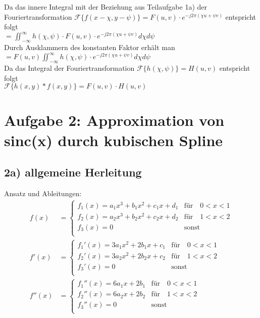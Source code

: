 \documentclass[a4paper,11pt,oneside]{scrartcl}
\begin{document}
Da das innere Integral mit der Beziehung aus Teilaufgabe 1a) der Fouriertransformation $\mathcal{F}\{f(x-\chi,y-\psi)\}=F(u,v)\cdot e^{-j2\pi(\chi u+\psi v)}$ entspricht folgt \\

$=\iint_{-\infty}^{\infty}h(\chi,\psi)\cdot F(u,v)\cdot e^{-j2\pi(\chi u+\psi v)} d\chi d\psi$ \\

Durch Ausklammern des konstanten Faktor erhält man \\

$=F(u,v)\iint_{-\infty}^{\infty}h(\chi,\psi)\cdot e^{-j2\pi(\chi u+\psi v)} d\chi d\psi$ \\

Da das Integral der Fouriertransformation $\mathcal{F}\{h(\chi,\psi)\}=H(u,v)$ entspricht folgt \\

$\mathcal{F}\{h(x,y)\ast f(x,y)\}=F(u,v)\cdot H(u,v)$

\newpage

\section*{Aufgabe 2: Approximation von sinc(x) durch kubischen Spline}
\subsection*{2a) allgemeine Herleitung}
Ansatz und Ableitungen:\\
\begin{equation*}
\begin{array}{ll}
f(x) & = 
 \left\{ 
  \begin{array}{ll}
   f_1(x) = a_1x^3 + b_1x^2 + c_1x + d_1 & \text{für} \quad 0 < x < 1\\
   f_2(x) = a_2x^3 + b_2x^2 + c_2x + d_2 & \text{für} \quad 1 < x < 2\\
   f_3(x) = 0 & \text{sonst}\\
  \end{array} 
 \right.
\\[1cm]
f'(x) & = 
 \left\{ 
  \begin{array}{ll}
   f_1'(x) = 3a_1x^2 + 2b_1x + c_1 & \text{für} \quad 0 < x < 1\\
   f_2'(x) = 3a_2x^2 + 2b_2x + c_2 & \text{für} \quad 1 < x < 2\\
   f_3'(x) = 0 & \text{sonst}\\
  \end{array} 
 \right.
\\[1cm]
f''(x) & = 
 \left\{
  \begin{array}{ll}
   f_1''(x) = 6a_1x + 2b_1 & \text{für} \quad 0 < x < 1\\
   f_2''(x) = 6a_2x + 2b_2 & \text{für} \quad 1 < x < 2\\
   f_3''(x) = 0 & \text{sonst}\\
  \end{array}
 \right.
 \end{array}
\end{equation*}\\
\end{document}
